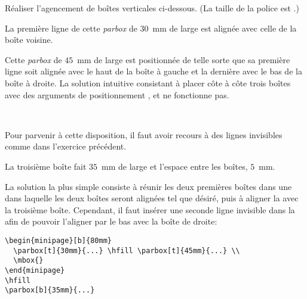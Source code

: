 \begin{exercice}
  Réaliser l'agencement de boîtes verticales ci-dessous. (La taille de
  la police est .)
  \begin{center}
    \begin{minipage}{120mm}
      \footnotesize
      \begin{minipage}[b]{80mm}
        \parbox[t]{30mm}{La première ligne de cette \emph{parbox} de
          $30$~mm de large est alignée avec celle de la boîte
          voisine.}
        \hfill
        \parbox[t]{45mm}{Cette \emph{parbox} de $45$~mm de large est
          positionnée de telle sorte que sa première ligne soit
          alignée avec le haut de la boîte à gauche et la dernière
          avec le bas de la boîte à droite. La solution intuitive
          consistant à placer côte à côte trois boîtes avec des
          arguments de positionnement ,  et 
          ne fonctionne pas.} \\
        \mbox{}
      \end{minipage}
      \hfill
      \parbox[b]{35mm}{Pour parvenir à cette disposition, il faut
        avoir recours à des lignes invisibles comme dans l'exercice
        précédent.}
    \end{minipage}
  \end{center}
  La troisième boîte fait $35$~mm de large et l'espace entre les
  boîtes, $5$~mm.
  \begin{sol}
    La solution la plus simple consiste à réunir les deux premières
    boîtes dans une  dans laquelle les deux boîtes seront
    alignées tel que désiré, puis à aligner la  avec la
    troisième boîte. Cependant, il faut insérer une seconde ligne
    invisible dans la  afin de pouvoir l'aligner par le
    bas avec la boîte de droite:
\begin{lstlisting}
\begin{minipage}[b]{80mm}
  \parbox[t]{30mm}{...} \hfill \parbox[t]{45mm}{...} \\
  \mbox{}
\end{minipage}
\hfill
\parbox[b]{35mm}{...}
\end{lstlisting}
  \end{sol}
\end{exercice}


